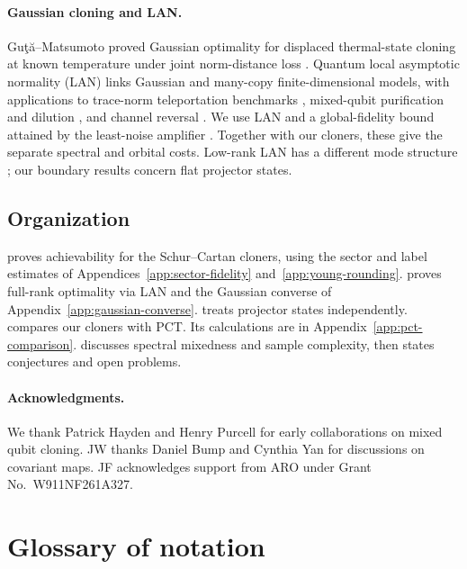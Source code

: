 \documentclass[11pt]{article}
\theoremstyle{remark}
\theoremstyle{plain}
\begin{document}
\paragraph{Gaussian cloning and LAN.}
Gu{\c t}{\u a}--Matsumoto proved Gaussian optimality for displaced
thermal-state cloning at known temperature under joint norm-distance loss
\cite{GutaMatsumoto2006MixedGaussianCloning}.
Quantum local asymptotic normality (LAN) links Gaussian and many-copy
finite-dimensional models, with applications to trace-norm
teleportation benchmarks \cite{GutaBowlesAdesso2010Teleportation},
mixed-qubit purification and dilution \cite{BowlesGutaAdesso2011Purification},
and channel reversal \cite{BowlesGutaAdesso2012Reversal}.
We use LAN
\cite{GutaJencova2007LAN,GutaKahn2006LANQubits,
KahnGuta2009LANFiniteDimensional} and a global-fidelity bound attained by the
least-noise amplifier
\cite{Caves1982LinearAmplifiers,GutaMatsumoto2006MixedGaussianCloning}.
Together with our cloners, these give the separate spectral and orbital costs.
Low-rank LAN has a different mode structure \cite{LahiryNussbaum2024};
our boundary results concern flat projector states.

\subsection{Organization}

 proves achievability for the Schur--Cartan cloners,
using the sector and label estimates of
Appendices~\ref{app:sector-fidelity} and~\ref{app:young-rounding}.
 proves full-rank optimality via LAN and the Gaussian
converse of Appendix~\ref{app:gaussian-converse}.
 treats projector states independently.
 compares our cloners with PCT. Its calculations
are in Appendix~\ref{app:pct-comparison}.
 discusses spectral mixedness and sample complexity,
then states conjectures and open problems.

\paragraph{Acknowledgments.}
We thank Patrick Hayden and Henry Purcell for early collaborations on
mixed qubit cloning.  JW thanks Daniel Bump and Cynthia Yan for
discussions on covariant maps.  JF acknowledges support from ARO under
Grant No.~W911NF261A327.

\section*{Glossary of notation}
\end{document}
